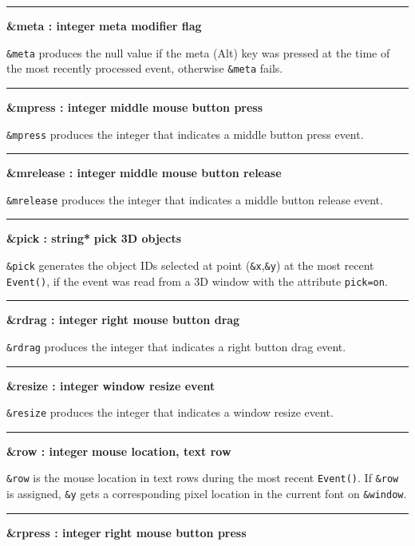\bigskip\hrule\vspace{0.1cm}
\noindent
{\bf \&meta : integer } \hfill {\bf meta modifier flag}

\noindent
\texttt{\&meta} produces the null value if the meta (Alt) key was
pressed at the time of the most recently processed event, otherwise
\texttt{\&meta} fails.

\bigskip\hrule\vspace{0.1cm}
\noindent
{\bf \&mpress : integer } \hfill {\bf middle mouse button press}

\noindent
\texttt{\&mpress} produces the integer that indicates a middle button
press event.

\bigskip\hrule\vspace{0.1cm}
\noindent
{\bf \&mrelease : integer } \hfill {\bf middle mouse button release}

\noindent
\texttt{\&mrelease} produces the integer that indicates a middle button
release event.

\bigskip\hrule\vspace{0.1cm}
\noindent
{\bf \&pick : string* } \hfill {\bf pick 3D objects}

\noindent
\texttt{\&pick} generates the object IDs selected at point
(\texttt{\&x},\texttt{\&y}) at the most recent \texttt{Event()}, if the
event was read from a 3D window with the attribute \texttt{pick=on}.

\bigskip\hrule\vspace{0.1cm}
\noindent
{\bf \&rdrag : integer } \hfill {\bf right mouse button drag}

\noindent
\texttt{\&rdrag} produces the integer that indicates a right button drag
event.

\bigskip\hrule\vspace{0.1cm}
\noindent
{\bf \&resize : integer } \hfill {\bf window resize event}

\noindent
\texttt{\&resize} produces the integer that indicates a window resize
event.

\bigskip\hrule\vspace{0.1cm}
\noindent
{\bf \&row : integer } \hfill {\bf mouse location, text row}

\noindent
\texttt{\&row} is the mouse location in text rows during the most recent
\texttt{Event()}. If \texttt{\&row} is assigned, \texttt{\&y} gets a
corresponding pixel location in the current font on \texttt{\&window}.

\bigskip\hrule\vspace{0.1cm}
\noindent
{\bf \&rpress : integer } \hfill {\bf right mouse button press}

